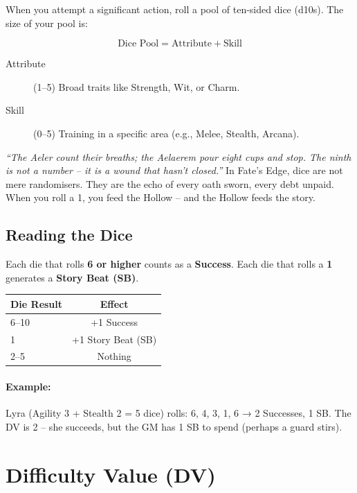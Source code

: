 When you attempt a significant action, roll a pool of ten-sided dice (d10s). The size of your pool is:

\[
\text{Dice Pool} = \text{Attribute} + \text{Skill}
\]

\begin{description}
  \item[Attribute] (1–5) Broad traits like Strength, Wit, or Charm.
  \item[Skill] (0–5) Training in a specific area (e.g., Melee, Stealth, Arcana).
\end{description}

\begin{tcolorbox}[colback=red!5!white,colframe=red!75!black,title=Lore of the Fall: The Weight of Numbers]
\emph{“The Aeler count their breaths; the Aelaerem pour eight cups and stop. The ninth is not a number – it is a wound that hasn’t closed.”}  
In Fate’s Edge, dice are not mere randomisers. They are the echo of every oath sworn, every debt unpaid. When you roll a 1, you feed the Hollow – and the Hollow feeds the story.
\end{tcolorbox}

\subsection*{Reading the Dice}

Each die that rolls \textbf{6 or higher} counts as a \textbf{Success}.  
Each die that rolls a \textbf{1} generates a \textbf{Story Beat (SB)}.

\begin{center}
\begin{tabular}{lc}
\toprule
\textbf{Die Result} & \textbf{Effect} \\
\midrule
6–10 & +1 Success \\
1 & +1 Story Beat (SB) \\
2–5 & Nothing \\
\bottomrule
\end{tabular}
\end{center}

\paragraph{Example:} Lyra (Agility 3 + Stealth 2 = 5 dice) rolls: 6, 4, 3, 1, 6 → 2 Successes, 1 SB. The DV is 2 – she succeeds, but the GM has 1 SB to spend (perhaps a guard stirs).

\section{Difficulty Value (DV)}
\label{sec:difficulty-value}

